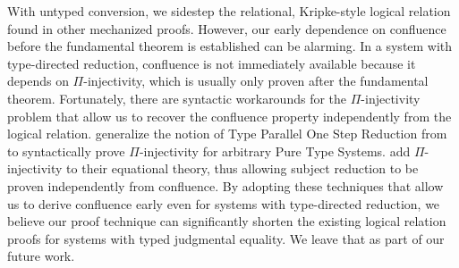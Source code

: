\documentclass[\ifpublic nolinenum\else\fi,online,OA]{jfp}
\newcommand{\scw}[1]{}
\newcommand{\yl}[1]{}
\theoremstyle{definition}
\begin{document}
With untyped conversion,
we sidestep the relational, Kripke-style logical relation found in
other mechanized proofs. \scw{Need to define Kripke-style. Also the other
proofs need Kripke style because they are defining typed relations, not untyped
relations. } \yl{I wonder if
we can just assume some more technical knowledge from the readers in
this section.}
However, our early dependence on confluence
before the fundamental theorem is established can be alarming.
In a system with type-directed reduction,
confluence is not immediately available because it
depends on $\Pi$-injectivity, which is usually only proven after the
fundamental theorem.\scw{confluence depends on Pi injectivity? I thought
it was only needed for subject reduction}\yl{it's
transitive. Confluence depends on subject reduction, which in turn
depends on pi injectivity. Maybe it's worth spelling out the details}
Fortunately, there are syntactic workarounds for the $\Pi$-injectivity
problem that allow us to recover the confluence property independently
from the logical relation. \citet{siles2012pure} generalize the
notion of Type Parallel One Step Reduction from \citet{adams2006pure}
to syntactically prove $\Pi$-injectivity for arbitrary Pure Type
Systems. \citet{weirich:systemd} add $\Pi$-injectivity to their
equational theory, thus allowing subject reduction to be proven
independently from confluence. By adopting these techniques that allow
us to derive confluence early even for systems with type-directed
reduction, we believe our proof technique can significantly shorten
the existing logical relation proofs for systems with typed
judgmental equality. We leave that as part of our future work.
\end{document}

